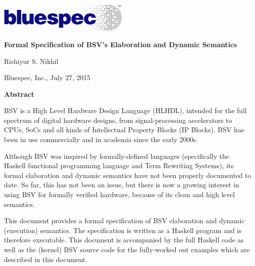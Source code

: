 \documentclass[11pt]{article}
\newcommand{\hm}{\hspace*{1em}}
\newlength{\hlessmm}
\begin{document}

\begin{center}

\centerline{\includegraphics[width=2.5in,angle=0]{Figures/Fig_Logo_2color_on_white}}

\vspace{2ex}

{\Large\bf Formal Specification of BSV's Elaboration and Dynamic Semantics}

\vspace{1ex}

Rishiyur S. Nikhil

\vspace{1ex}

Bluespec, Inc., July 27, 2015

\end{center}


\begin{center}
\begin{minipage}{\hlessmm}
\begin{center}
\bf Abstract
\end{center}

BSV is a High Level Hardware Design Language (HLHDL), intended for the
full spectrum of digital hardware designs, from signal-processing
accelerators to CPUs, SoCs and all kinds of Intellectual Property
Blocks (IP Blocks).  BSV has been in use commercially and in academia
since the early 2000s.

\hm Although BSV was inspired by formally-defined languages
(specifically the Haskell functional programming language and Term
Rewriting Systems), its formal elaboration and dynamic semantics have
not been properly documented to date.  So far, this has not been an
issue, but there is now a growing interest in using BSV for formally
verified hardware, because of its clean and high level semantics.

\hm This document provides a formal specification of BSV elaboration
and dynamic (execution) semantics. The specification is written as a
Haskell program and is therefore executable.  This document is
accompanied by the full Haskell code as well as the (kernel) BSV
source code for the fully-worked out examples which are described in
this document.

\end{minipage}
\end{center}
\end{document}
